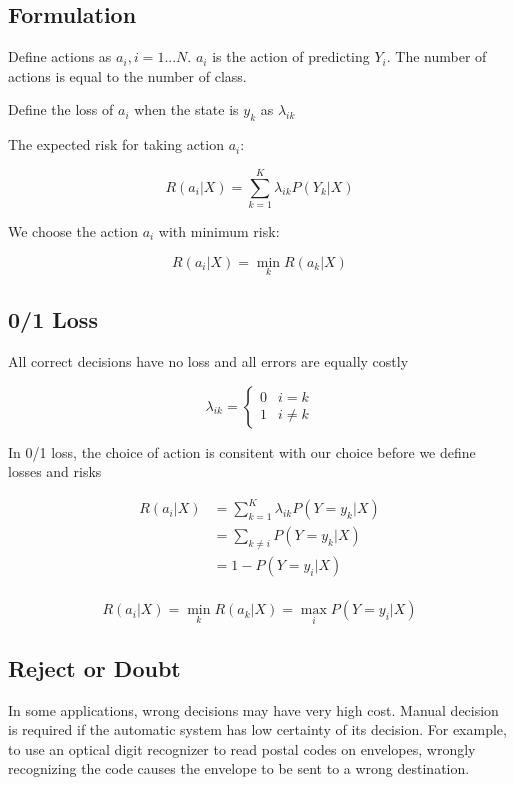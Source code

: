 \begin{multicols*}{2}
\subsection{Formulation}

\noindent Define actions as $a_{i}, i=1...N$. $a_{i}$ is the action of predicting $Y_{i}$. The number of actions is equal to the number of class. 

\noindent Define the loss of $a_{i}$ when the state is $y_{k}$ as $\lambda_{ik}$

\noindent The expected risk for taking action $a_{i}$:

$$R(a_{i} | X) = \sum^{K}_{k=1} \lambda_{ik} P(Y_{k} | X)$$

\noindent We choose the action $a_{i}$ with minimum risk:

$$R(a_{i}|X) = \!\min_{k} R(a_{k}|X)$$

\subsection{0/1 Loss}

\noindent All correct decisions have no loss and all errors are equally costly

$$
\lambda_{ik} = 
\begin{cases}
0 & i=k\\
1 & i \ne k
\end{cases}
$$

\noindent In 0/1 loss, the choice of action is consitent with our choice before we define losses and risks

\begin{equation*}
\begin{split}
    R(a_i | X) &= \sum_{k=1}^K \lambda_{ik} P(Y=y_k|X) \\
    &= \sum_{k \ne i} P(Y=y_k | X) \\
    &= 1-P(Y=y_i|X) \\
\end{split}
\end{equation*}

$$R(a_i|X) = \!\min_{k} R(a_k|X) = \!\max_i P(Y=y_i|X)$$

\subsection{Reject or Doubt}
In some applications, wrong decisions may have very high cost. Manual decision is required if the automatic system has low certainty of its decision. For example, to use an optical digit recognizer to read postal codes on envelopes, wrongly recognizing the code causes the envelope to be sent to a wrong destination.


\end{multicols*}
